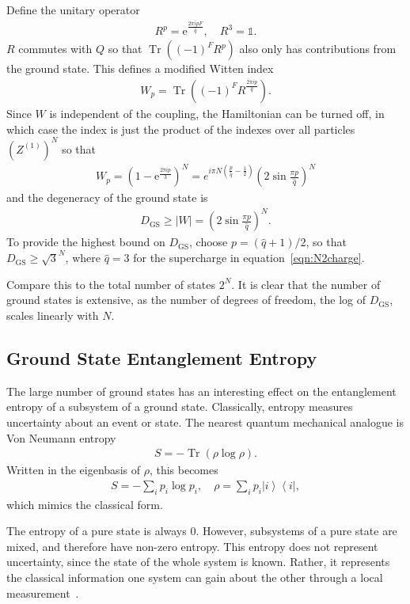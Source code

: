 \documentclass[12pt]{article} %
\newcommand{\abs}[1]{\left|#1\right|}
\renewcommand{\th}[1]{\frac{1}{#1}}
\newcommand{\e}{\text{e}}
\newcommand{\ket}[1]{\left|#1\right\rangle}
\newcommand{\bra}[1]{\left\langle#1\right|}
\DeclareMathOperator{\Tr}{Tr}
\begin{document}
Define the unitary operator 
\begin{align}
R^p = \e^{\frac{2\pi ipF}{\hat q}},\quad R^3 = \mathbb{1}.
\end{align}
$R$ commutes with $Q$ so that $\Tr\left((-1)^FR^p\right)$ also only has contributions from the ground state. This defines a modified Witten index
\begin{align}
W_p = \Tr\left((-1)^FR^\frac{2\pi ip}{\hat q}\right).
\end{align}
Since $W$ is independent of the coupling, the Hamiltonian can be turned off, in which case the index is just the product of the indexes over all particles $\left(Z^{(1)}\right)^N$ so that 
\begin{align}
W_p = \left(1-\e^{\frac{2\pi ip}{3}}\right)^N = e^{i\pi N\left(\frac{p}{\hat q} - \th{2}\right)}\left(2\sin\frac{\pi p}{\hat q}\right)^N
\end{align}
and the degeneracy of the ground state is 
\begin{align}
D_\text{GS} \ge \abs{W} = \left(2\sin\frac{\pi p}{\hat q}\right)^N. \label{eqn:dgs}
\end{align}
To provide the highest bound on $D_\text{GS}$, choose $p = (\hat q+1)/2$, so that $D_\text{GS} \ge \sqrt{3}^N$, where $\hat q = 3$ for the supercharge in equation~\ref{eqn:N2charge}.

Compare this to the total number of states $2^N$. It is clear that the number of ground states is extensive, as the number of degrees of freedom, the log of $D_\text{GS}$, scales linearly with $N$.

\subsection{Ground State Entanglement Entropy} \emph{} \label{sub:entangle}

The large number of ground states has an interesting effect on the entanglement entropy of a subsystem of a ground state. Classically, entropy measures uncertainty about an event or state. The nearest quantum mechanical analogue is Von Neumann entropy
\begin{align}
S = -\Tr(\rho\log\rho).\label{eqn:vnent}
\end{align}
Written in the eigenbasis of $\rho$, this becomes 
\begin{align}
S = -\sum_ip_i\log p_i,\quad \rho = \sum_i p_i\ket{i}\bra{i},
\end{align}
which mimics the classical form.

The entropy of a pure state is always 0. However, subsystems of a pure state are mixed, and therefore have non-zero entropy. This entropy does not represent uncertainty, since the state of the whole system is known. Rather, it represents the classical information one system can gain about the other through a local measurement~\cite{janzing09}.
\end{document}
